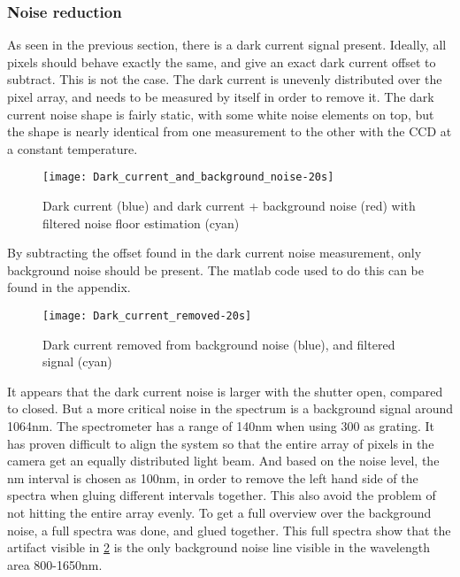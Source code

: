\subsubsection{Noise reduction}

As seen in the previous section, there is a dark current signal present. Ideally, all pixels should behave exactly the same, and give an exact dark current offset to subtract. This is not the case. The dark current is unevenly distributed over the pixel array, and needs to be measured by itself in order to remove it. The dark current noise shape is fairly static, with some white noise elements on top, but the shape is nearly identical from one measurement to the other with the CCD at a constant temperature. 

\begin{figure}[H]
\centering
\texttt{[image: Dark\_current\_and\_background\_noise-20s]}
\caption[Dark current and noise]{Dark current (blue) and dark current + background noise (red) with filtered noise floor estimation (cyan)}%
\label{fig:dark_current_and_background_noise}%
\end{figure}

By subtracting the offset found in the dark current noise measurement, only background noise should be present. The matlab code used to do this can be found in the appendix.

\begin{figure}[H]
\centering
\texttt{[image: Dark\_current\_removed-20s]}
\caption[Dark current removed]{Dark current removed from background noise (blue), and filtered signal (cyan)}%
\label{fig:dark_current_removed-20s}%
\end{figure}

It appears that the dark current noise is larger with the shutter open, compared to closed. But a more critical noise in the spectrum is a background signal around 1064nm. The spectrometer has a range of 140nm when using 300 as grating. It has proven difficult to align the system so that the entire array of pixels in the camera get an equally distributed light beam. And based on the noise level, the nm interval is chosen as 100nm, in order to remove the left hand side of the spectra when gluing different intervals together. This also avoid the problem of not hitting the entire array evenly. To get a full overview over the background noise, a full spectra was done, and glued together. This full spectra show that the artifact visible in \ref{fig:dark_current_removed-20s} is the only background noise line visible in the wavelength area 800-1650nm.

